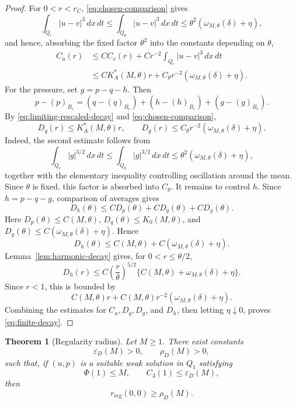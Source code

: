 \documentclass[pdflatex,sn-mathphys-num]{sn-jnl}
\numberwithin{equation}{section}
\theoremstyle{thmstyleone}
\newtheorem{theorem}{Theorem}[section]
\theoremstyle{thmstylethree}
\newcommand{\eps}{\varepsilon}
\newcommand{\reg}{\mathrm{reg}}
\newcommand{\dxdt}{\,dx\,dt}
\begin{document}
\begin{proof}
For \(0<r<r_C\), \eqref{eq:chosen-comparison} gives
\[
        \int_{Q_r}|u-v|^3\dxdt
        \le \int_{Q_\theta}|u-v|^3\dxdt
        \le \theta^2(\omega_{M,\theta}(\delta)+\eta),
\]
and hence, absorbing the fixed factor \(\theta^2\) into the constants depending on \(\theta\),
\[
\begin{aligned}
C_u(r)
&\le C C_v(r)+Cr^{-2}\int_{Q_r}|u-v|^3\dxdt\\
&\le CK_A^*(M,\theta)r+C_\theta r^{-2}(\omega_{M,\theta}(\delta)+\eta).
\end{aligned}
\]
For the pressure, set \(g=p-q-h\).  Then
\[
        p-(p)_{B_r}
        =(q-(q)_{B_r})+(h-(h)_{B_r})+(g-(g)_{B_r}).
\]
By \eqref{eq:limiting-rescaled-decay} and \eqref{eq:chosen-comparison},
\[
        D_q(r)\le K_A^*(M,\theta)r,
        \qquad
        D_g(r)\le C_\theta r^{-2}(\omega_{M,\theta}(\delta)+\eta).
\]
Indeed, the second estimate follows from
\[
        \int_{Q_r}|g|^{3/2}\dxdt
        \le \int_{Q_\theta}|g|^{3/2}\dxdt
        \le \theta^2(\omega_{M,\theta}(\delta)+\eta),
\]
together with the elementary inequality controlling oscillation around the mean.  Since \(\theta\) is fixed, this factor is absorbed into \(C_\theta\).
It remains to control \(h\).  Since \(h=p-q-g\), comparison of averages gives
\[
        D_h(\theta)\le C D_p(\theta)+C D_q(\theta)+C D_g(\theta).
\]
Here \(D_p(\theta)\le C(M,\theta)\), \(D_q(\theta)\le K_0(M,\theta)\), and \(D_g(\theta)\le C(\omega_{M,\theta}(\delta)+\eta)\).  Hence
\[
        D_h(\theta)
        \le C(M,\theta)+C(\omega_{M,\theta}(\delta)+\eta).
\]
Lemma~\ref{lem:harmonic-decay} gives, for \(0<r\le\theta/2\),
\[
        D_h(r)
        \le C\left(\frac r\theta\right)^{5/2}
        \{C(M,\theta)+\omega_{M,\theta}(\delta)+\eta\}.
\]
Since \(r<1\), this is bounded by
\[
        C(M,\theta)r+C(M,\theta)r^{-2}(\omega_{M,\theta}(\delta)+\eta).
\]
Combining the estimates for \(C_u,D_q,D_g\), and \(D_h\), then letting \(\eta\downarrow0\), proves \eqref{eq:finite-decay}.
\end{proof}

\begin{theorem}[Regularity radius]
\label{thm:regularity-radius}
Let \(M\ge1\).  There exist constants
\[
        \eps_D(M)>0,
        \qquad
        \rho_D(M)>0,
\]
such that, if \((u,p)\) is a suitable weak solution in \(Q_1\) satisfying
\[
        \Phi(1)\le M,
        \qquad
        C_3(1)\le\eps_D(M),
\]
then
\[
        r_{\reg}(0,0)\ge\rho_D(M).
\]
\end{theorem}
\end{document}
